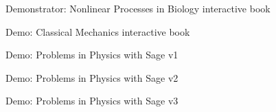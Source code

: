 \begin{workpackage}[id=dissem,wphases=18-48!.5,
  title=Dissemination,
  SARM=1,
  USORM=7,
  USHRM=8,
  USRM=24
]
\begin{wpdelivs}
 \begin{wpdeliv}[due=36,id=ibook2,dissem=PU,nature=DEM]{Demonstrator: Nonlinear Processes in Biology  interactive book} \end{wpdeliv}

 \begin{wpdeliv}[due=40,id=ibook2,dissem=PU,nature=DEM]{Demo: Classical Mechanics interactive book} \end{wpdeliv}

 \begin{wpdeliv}[due=12,id=ibook3a,dissem=PU,nature=DEM]{Demo: Problems in Physics with Sage v1} \end{wpdeliv}
 \begin{wpdeliv}[due=30,id=ibook3b,dissem=PU,nature=DEM]{Demo: Problems in Physics with Sage v2} \end{wpdeliv}
 \begin{wpdeliv}[due=44,id=ibook3c,dissem=PU,nature=DEM]{Demo: Problems in Physics with Sage v3} \end{wpdeliv}

\end{wpdelivs}


\end{workpackage}

